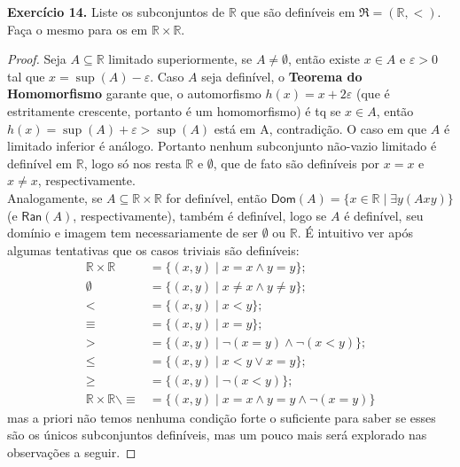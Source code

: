 \documentclass[11pt]{article}
\newcommand{\mf}[1]{\mathfrak{#1}}
\newcommand{\msf}[1]{\mathsf{#1}}
\newcommand{\mbb}[1]{\mathbb{#1}}
\begin{document}
\begin{shaded}
\textbf{Exercício 14.} Liste os subconjuntos de $\mbb{R}$ que são definíveis em $\mf{R}=(\mbb{R},<)$. Faça o mesmo para os em $\mbb{R}\times\mbb{R}$.
\end{shaded}

\begin{proof}
    Seja $A\subseteq\mbb{R}$ limitado superiormente, se $A\neq\emptyset$, então existe $x\in A$ e $\varepsilon>0$ tal que $x=\sup(A)-\varepsilon$. Caso $A$ seja definível, o \textbf{Teorema do Homomorfismo} garante que, o automorfismo $h(x)=x+2\varepsilon$ (que é estritamente crescente, portanto é um homomorfismo) é tq se $x\in A$, então $h(x)=\sup(A)+\varepsilon>\sup(A)$ está em A, contradição. O caso em que $A$ é limitado inferior é análogo. Portanto nenhum subconjunto não-vazio limitado é definível em $\mbb{R}$, logo só nos resta $\mbb{R}$ e $\emptyset$, que de fato são definíveis por $x=x$ e $x\neq x$, respectivamente.\\
    Analogamente, se $A\subseteq\mbb{R}\times\mbb{R}$ for definível, então $\msf{Dom}(A)=\{x\in\mbb{R}\mid\exists y(Axy)\}$ (e $\msf{Ran}(A)$, respectivamente), também é definível, logo se $A$ é definível, seu domínio e imagem tem necessariamente de ser $\emptyset$ ou $\mbb{R}$. É intuitivo ver após algumas tentativas que os casos triviais são definíveis:
    \begin{align*}
        \mbb{R}\times\mbb{R} & = \{(x,y)\mid x=x \wedge y=y\};\\
        \emptyset & = \{(x,y)\mid x\neq x\wedge y\neq y\};\\
        < & = \{(x,y)\mid x<y\};\\
        \equiv & = \{(x,y)\mid x=y\};\\
        > & = \{(x,y)\mid\neg(x=y)\wedge\neg(x<y)\};\\
        \leq & = \{(x,y)\mid x<y\vee x=y\};\\
        \geq & = \{(x,y)\mid \neg(x<y)\};\\
        \mbb{R}\times\mbb{R}\backslash\equiv & =\{(x,y)\mid x=x\wedge y=y\wedge \neg(x=y)\}
    \end{align*}
    mas a priori não temos nenhuma condição forte o suficiente para saber se esses são os únicos subconjuntos definíveis, mas um pouco mais será explorado nas observações a seguir.
\end{proof}
\end{document}
